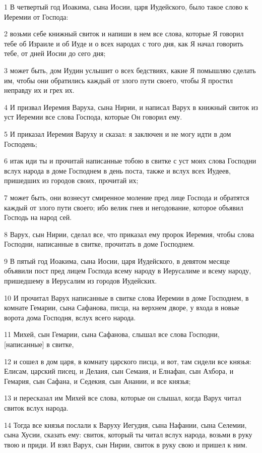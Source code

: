 \par 1 В четвертый год Иоакима, сына Иосии, царя Иудейского, было такое слово к Иеремии от Господа:
\par 2 возьми себе книжный свиток и напиши в нем все слова, которые Я говорил тебе об Израиле и об Иуде и о всех народах с того дня, как Я начал говорить тебе, от дней Иосии до сего дня;
\par 3 может быть, дом Иудин услышит о всех бедствиях, какие Я помышляю сделать им, чтобы они обратились каждый от злого пути своего, чтобы Я простил неправду их и грех их.
\par 4 И призвал Иеремия Варуха, сына Нирии, и написал Варух в книжный свиток из уст Иеремии все слова Господа, которые Он говорил ему.
\par 5 И приказал Иеремия Варуху и сказал: я заключен и не могу идти в дом Господень;
\par 6 итак иди ты и прочитай написанные тобою в свитке с уст моих слова Господни вслух народа в доме Господнем в день поста, также и вслух всех Иудеев, пришедших из городов своих, прочитай их;
\par 7 может быть, они вознесут смиренное моление пред лице Господа и обратятся каждый от злого пути своего; ибо велик гнев и негодование, которое объявил Господь на народ сей.
\par 8 Варух, сын Нирии, сделал все, что приказал ему пророк Иеремия, чтобы слова Господни, написанные в свитке, прочитать в доме Господнем.
\par 9 В пятый год Иоакима, сына Иосии, царя Иудейского, в девятом месяце объявили пост пред лицем Господа всему народу в Иерусалиме и всему народу, пришедшему в Иерусалим из городов Иудейских.
\par 10 И прочитал Варух написанные в свитке слова Иеремии в доме Господнем, в комнате Гемарии, сына Сафанова, писца, на верхнем дворе, у входа в новые ворота дома Господня, вслух всего народа.
\par 11 Михей, сын Гемарии, сына Сафанова, слышал все слова Господни, [написанные] в свитке,
\par 12 и сошел в дом царя, в комнату царского писца, и вот, там сидели все князья: Елисам, царский писец, и Делаия, сын Семаия, и Елнафан, сын Ахбора, и Гемария, сын Сафана, и Седекия, сын Анании, и все князья;
\par 13 и пересказал им Михей все слова, которые он слышал, когда Варух читал свиток вслух народа.
\par 14 Тогда все князья послали к Варуху Иегудия, сына Нафании, сына Селемии, сына Хусии, сказать ему: свиток, который ты читал вслух народа, возьми в руку твою и приди. И взял Варух, сын Нирии, свиток в руку свою и пришел к ним.
